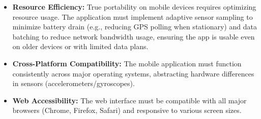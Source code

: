 \begin{itemize}
    \item \textbf{Resource Efficiency:} True portability on mobile devices requires optimizing resource usage. The application must implement adaptive sensor sampling to minimize battery drain (e.g., reducing GPS polling when stationary) and data batching to reduce network bandwidth usage, ensuring the app is usable even on older devices or with limited data plans.
    
    \item \textbf{Cross-Platform Compatibility:} The mobile application must function consistently across major operating systems, abstracting hardware differences in sensors (accelerometers/gyroscopes).
    
    \item \textbf{Web Accessibility:} The web interface must be compatible with all major browsers (Chrome, Firefox, Safari) and responsive to various screen sizes.
\end{itemize}